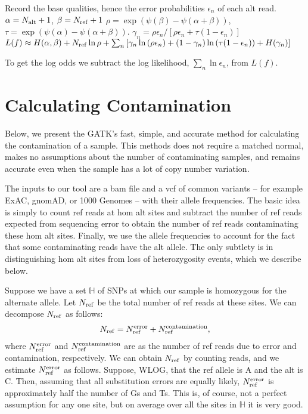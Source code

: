 \documentclass[nofootinbib,amssymb,amsmath]{revtex4}
\begin{document}
\begin{algorithm}
\begin{algorithmic}[1]
\State Record the base qualities, hence the error probabilities $\epsilon_n$ of each alt read.
\State $\alpha = N_{\rm alt} + 1$, $\beta = N_{\rm ref} + 1$
\State $\rho = \exp \left( \psi(\beta) - \psi(\alpha + \beta) \right) $, $\tau = \exp \left( \psi(\alpha) - \psi(\alpha + \beta) \right)$.
\State $\gamma_n =  \rho \epsilon_n / \left[ \rho \epsilon_n + \tau (1 - \epsilon_n) \right]$
\State $L(f) \approx H(\alpha, \beta) + N_{\rm ref} \ln \rho + \sum_n \left[ \gamma_n \ln \left( \rho \epsilon_n \right) + (1 - \gamma_n)\ln \left( \tau (1 - \epsilon_n) \right) + H(\gamma_n) \right]$
\end{algorithmic}
\end{algorithm}
To get the log odds we subtract the log likelihood, $\sum_n \ln \epsilon_n$, from $L(f)$.



\section{Calculating Contamination}
Below, we present the GATK's fast, simple, and accurate method for calculating the contamination of a sample.  This methods does not require a matched normal, makes no assumptions about the number of contaminating samples, and remains accurate even when the sample has a lot of copy number variation.

The inputs to our tool are a bam file and a vcf of common variants -- for example ExAC, gnomAD, or 1000 Genomes -- with their allele frequencies.  The basic idea is simply to count ref reads at hom alt sites and subtract the number of ref reads expected from sequencing error to obtain the number of ref reads contaminating these hom alt sites.  Finally, we use the allele frequencies to account for the fact that some contaminating reads have the alt allele.  The only subtlety is in distinguishing hom alt sites from loss of heterozygosity events, which we describe below.

Suppose we have a set $\mathbb{H}$ of SNPs at which our sample is homozygous for the alternate allele.  Let $N_{\rm ref}$ be the total number of ref reads at these sites.  We can decompose $N_{\rm ref}$ as follows:
\begin{align}
N_{\rm ref} = N_{\rm ref}^{\rm error} + N_{\rm ref}^{\rm contamination}, \label{decomposition}
\end{align}
where $N_{\rm ref}^{\rm error}$  and $N_{\rm ref}^{\rm contamination}$ are as the number of ref reads due to error and contamination, respectively.  We can obtain $N_{\rm ref}$ by counting reads, and we estimate $N_{\rm ref}^{\rm error}$ as follows.  Suppose, WLOG, that the ref allele is A and the alt is C.  Then, assuming that all substitution errors are equally likely, $N_{\rm ref}^{\rm error}$ is approximately half the number of Gs and Ts.  This is, of course, not a perfect assumption for any one site, but on average over all the sites in $\mathbb{H}$ it is very good.
\end{document}
